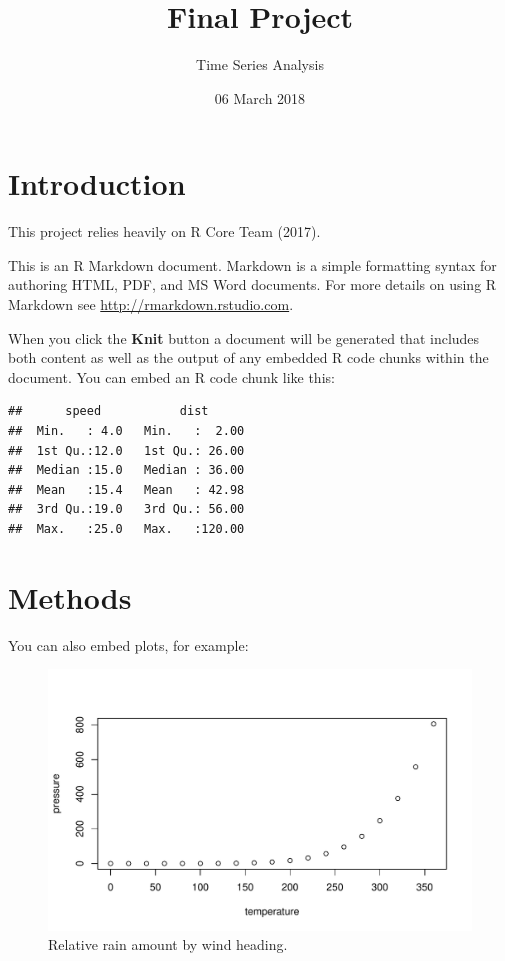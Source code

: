 \documentclass[]{article}
\title{Final Project}
\author{Time Series Analysis}
\date{06 March 2018}
\begin{document}
\maketitle

\newpage

{
\setcounter{tocdepth}{2}
\tableofcontents
}
\section{Introduction}\label{introduction}

This project relies heavily on R Core Team (2017).

This is an R Markdown document. Markdown is a simple formatting syntax
for authoring HTML, PDF, and MS Word documents. For more details on
using R Markdown see \url{http://rmarkdown.rstudio.com}.

When you click the \textbf{Knit} button a document will be generated
that includes both content as well as the output of any embedded R code
chunks within the document. You can embed an R code chunk like this:

\begin{verbatim}
##      speed           dist       
##  Min.   : 4.0   Min.   :  2.00  
##  1st Qu.:12.0   1st Qu.: 26.00  
##  Median :15.0   Median : 36.00  
##  Mean   :15.4   Mean   : 42.98  
##  3rd Qu.:19.0   3rd Qu.: 56.00  
##  Max.   :25.0   Max.   :120.00
\end{verbatim}

\section{Methods}\label{methods}

You can also embed plots, for example:

\begin{figure}

{\centering \includegraphics[width=0.7\linewidth]{./figures/pressure-1} 

}

\caption{Relative rain amount by wind heading.}\label{fig:pressure}
\end{figure}
\end{document}
